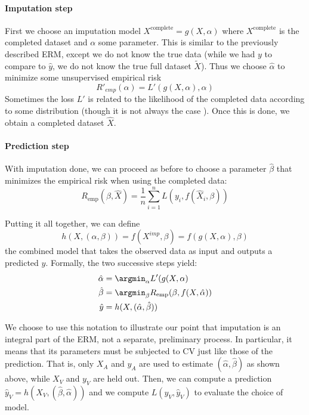 			\paragraph{Imputation step}
First we choose an imputation model $X^{\text{complete}} = g(X, \alpha)$ where $X^{\text{complete}}$ is the completed dataset and $\alpha$ some parameter. This is similar to the previously described ERM, except we do not know the true data (while we had $y$ to compare to $\hat{y}$, we do not know the true full dataset $\tilde{X}$). Thus we choose $\hat{\alpha}$ to minimize some unsupervised empirical risk
$$R'_{emp}(\alpha)=L'(g(X, \alpha), \alpha)$$
Sometimes the loss $L'$ is related to the likelihood of the completed data according to some distribution\cite{imputation_norm} (though it is not always the case \cite{imp_missforest}). Once this is done, we obtain a completed dataset $\hat{X}$.

			\paragraph{Prediction step}
With imputation done, we can proceed as before to choose a parameter $\hat{\beta}$ that minimizes the empirical risk when using the completed data:
	$$ R_{\text{emp}}(\beta, \hat{X}) = \frac{1}{n} \sum\limits_{i=1}^n L(y_i, f(\hat{X}_i, \beta))$$
	
Putting it all together, we can define 
$$ h(X, (\alpha, \beta)) = f(X^{imp}, \beta) = f( g(X, \alpha), \beta) $$
the combined model that takes the observed data as input and outputs a predicted $y$. Formally, the two successive steps yield:
\begin{align*}
\hat{\alpha} &= \argmin_{\alpha} L'(g(X,\alpha) \\
\hat{\beta} &= \argmin_{\beta} R_{\text{emp}}(\beta,f(X,\hat{\alpha})) \\
\hat{y} &= h(X, (\hat{\alpha}, \hat{\beta}))
\end{align*}

We choose to use this notation to illustrate our point that imputation is an integral part of the ERM, not a separate, preliminary process. In particular, it means that its parameters must be subjected to CV just like those of the prediction. That is, only $X_A$ and $y_A$ are used to estimate $(\hat{\alpha}, \hat{\beta})$ as shown above, while $X_V$ and $y_V$ are held out. Then, we can compute a prediction $\hat{y}_V = h(X_V, (\hat{\beta}, \hat{\alpha}))$ and we compute $L(y_V, \hat{y}_V)$ to evaluate the choice of model.

